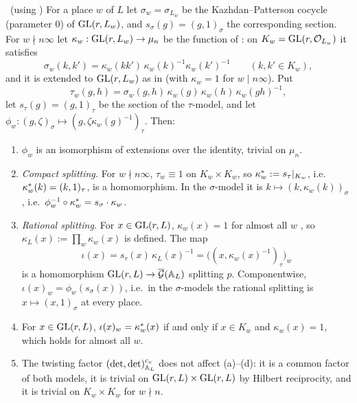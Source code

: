 \begin{lemma}\label{I:lem:splittings}\ (using \Ev)
For a place $w$ of $L$ let $\sigma_w=\sigma_{L_w}$ be the Kazhdan--Patterson cocycle (parameter $0$) of $\mathrm{GL}(r,L_w)$, and $s_\sigma(g)=(g,1)_\sigma$ the corresponding section. For $w\nmid n\infty$ let $\kappa_w:\mathrm{GL}(r,L_w)\to\mu_n$ be the function of \cite[\S2]{FK86}: on $K_w=\mathrm{GL}(r,\mathcal{O}_{L_w})$ it satisfies
\begin{equation}\label{I:eq:kappaK}
\sigma_w(k,k')=\kappa_w(kk')\,\kappa_w(k)^{-1}\kappa_w(k')^{-1}\qquad(k,k'\in K_w),
\end{equation}
and it is extended to $\mathrm{GL}(r,L_w)$ as in \cite[\S2]{FK86} (with $\kappa_w=1$ for $w\mid n\infty$). Put
\begin{equation}\label{I:eq:tausigma}
\tau_w(g,h)=\sigma_w(g,h)\,\kappa_w(g)\,\kappa_w(h)\,\kappa_w(gh)^{-1},
\end{equation}
let $s_\tau(g)=(g,1)_\tau$ be the section of the $\tau$-model, and let $\phi_w:(g,\zeta)_\sigma\mapsto(g,\zeta\kappa_w(g)^{-1})_\tau$. Then:
\begin{enumerate}[label=(\alph*)]
\item $\phi_w$ is an isomorphism of extensions over the identity, trivial on $\mu_n$.
\item \emph{Compact splitting.} For $w\nmid n\infty$, $\tau_w\equiv1$ on $K_w\times K_w$, so $\kappa^{*}_w:=s_\tau|_{K_w}$, i.e.\ $\kappa^{*}_w(k)=(k,1)_\tau$, is a homomorphism. In the $\sigma$-model it is $k\mapsto(k,\kappa_w(k))_\sigma$, i.e.\ $\phi_w^{-1}\circ\kappa^{*}_w=s_\sigma\cdot\kappa_w$.
\item \emph{Rational splitting.} For $x\in\mathrm{GL}(r,L)$, $\kappa_w(x)=1$ for almost all $w$ \cite[Prop.~0.1.3]{KP84}, so $\kappa_L(x):=\prod_w\kappa_w(x)$ is defined. The map
\[ \iota(x)=s_\tau(x)\,\kappa_L(x)^{-1}=\big((x,\kappa_w(x)^{-1})_\tau\big)_w \]
is a homomorphism $\mathrm{GL}(r,L)\to\overline{\mathcal{G}}(\mathbb{A}_L)$ splitting $p$. Componentwise, $\iota(x)_w=\phi_w(s_\sigma(x))$, i.e.\ in the $\sigma$-models the rational splitting is $x\mapsto(x,1)_\sigma$ at every place.
\item For $x\in\mathrm{GL}(r,L)$, $\iota(x)_w=\kappa^{*}_w(x)$ if and only if $x\in K_w$ and $\kappa_w(x)=1$, which holds for almost all $w$.
\item The twisting factor $(\det,\det)^{c_v}_{\mathbb{A}_L}$ does not affect (a)--(d): it is a common factor of both models, it is trivial on $\mathrm{GL}(r,L)\times\mathrm{GL}(r,L)$ by Hilbert reciprocity, and it is trivial on $K_w\times K_w$ for $w\nmid n$.
\end{enumerate}
\end{lemma}
